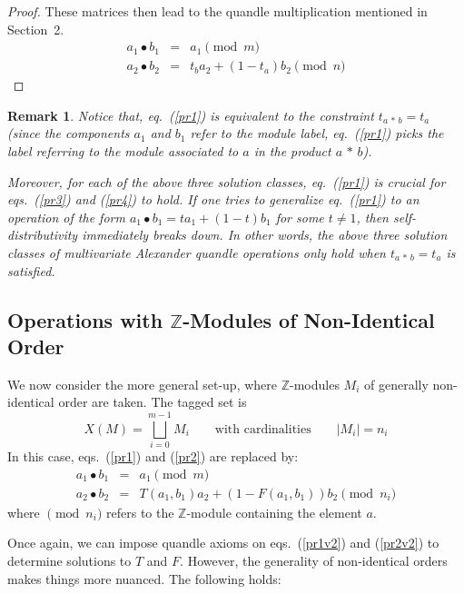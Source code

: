 \documentclass[a4paper,12pt]{article}
\newtheorem{remark}{Remark}[section]
\newcommand{\Z}{\mathbb{Z}}
\begin{document}
\begin{proof}
These matrices then lead to the quandle multiplication mentioned in Section~2.  
\begin{eqnarray}
    a_1 \bullet b_1 &=& a_1 \pmod{m}    \label{op5}  \\
    a_2 \bullet b_2 &=& t_{b} a_2 + (1 - t_{a}) b_2 \pmod{n}   \label{op6} 
\end{eqnarray} 


\end{proof}


\begin{remark} 
\label{remtab}
Notice that, eq.~(\ref{pr1}) is equivalent to the constraint $t_{a\,*\,b} = t_a$ (since the components $a_1$ and $b_1$ refer to the module label, eq.~(\ref{pr1}) picks the label referring to the module associated to  $a$ in the product $a\,*\,b$).     

Moreover, for each of the above three solution classes,  eq.~(\ref{pr1}) is   crucial for eqs.~(\ref{pr3}) and (\ref{pr4}) to hold. If one tries to generalize eq.~(\ref{pr1}) to an operation of the form $a_1 \bullet b_1 = t a_1 + (1 - t) b_1$ for some $t \neq 1$, then self-distributivity immediately breaks down. In other words, the above three solution classes of multivariate Alexander quandle   operations only hold when $t_{a\,*\,b} = t_a$ is satisfied.  
\end{remark}




\subsection{Operations with $\Z$-Modules of Non-Identical Order}

We now consider the more general set-up, where $\Z$-modules $M_i$ of generally non-identical order are taken.  The tagged set is 
\[  X(M) = \bigsqcup_{i=0}^{m - 1} M_{i}  \qquad \mbox{with cardinalities}  \qquad  | M_{i} | = n_{i}  \]
 In this case, eqs.~(\ref{pr1}) and (\ref{pr2}) are replaced by: 
\begin{eqnarray}
a_1 \bullet b_1 &=& a_1 \pmod{m}  \label{pr1v2}  \\
a_2 \bullet b_2 &=& T(a_1, b_1) a_2 + (1 - F(a_1, b_1)) b_2  \pmod{n_{i}}   \label{pr2v2} 
\end{eqnarray}  
where $\pmod{n_{i}}$  refers to the $\Z$-module containing the element $a$.  

Once again, we can impose quandle axioms on eqs.~(\ref{pr1v2}) and (\ref{pr2v2}) to determine solutions to $T$ and $F$. However, the generality of non-identical orders makes things more nuanced.  The following holds: 
 
\end{document}
